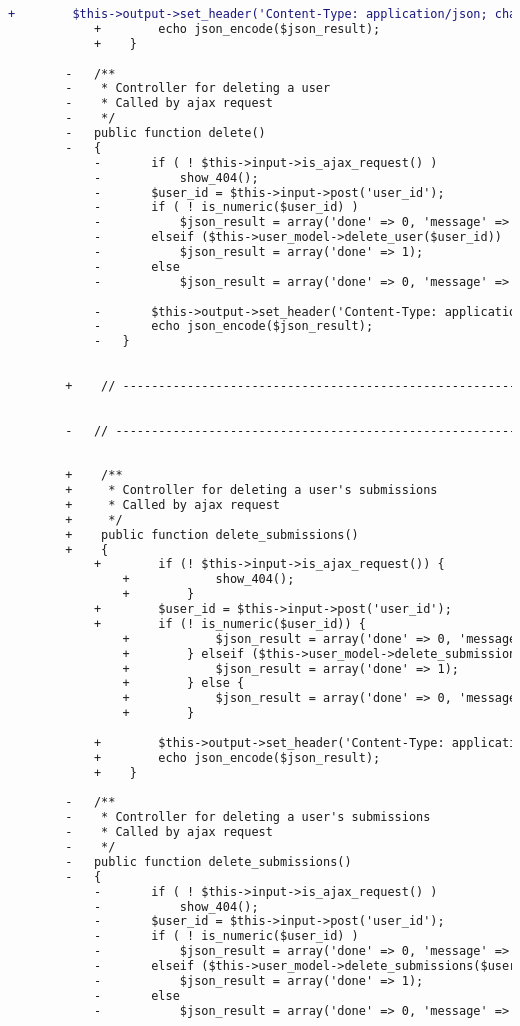 \begin{lstlisting}[language=diff, caption=Perubahan pada kode Users.php]
			+        $this->output->set_header('Content-Type: application/json; charset=utf-8');
			+        echo json_encode($json_result);
			+    }
		
		-	/**
		-	 * Controller for deleting a user
		-	 * Called by ajax request
		-	 */
		-	public function delete()
		-	{
			-		if ( ! $this->input->is_ajax_request() )
			-			show_404();
			-		$user_id = $this->input->post('user_id');
			-		if ( ! is_numeric($user_id) )
			-			$json_result = array('done' => 0, 'message' => 'Input Error');
			-		elseif ($this->user_model->delete_user($user_id))
			-			$json_result = array('done' => 1);
			-		else
			-			$json_result = array('done' => 0, 'message' => 'Deleting User Failed');
			
			-		$this->output->set_header('Content-Type: application/json; charset=utf-8');
			-		echo json_encode($json_result);
			-	}
		
		
		+    // ------------------------------------------------------------------------
		
		
		-	// ------------------------------------------------------------------------
		
		
		+    /**
		+     * Controller for deleting a user's submissions
		+     * Called by ajax request
		+     */
		+    public function delete_submissions()
		+    {
			+        if (! $this->input->is_ajax_request()) {
				+            show_404();
				+        }
			+        $user_id = $this->input->post('user_id');
			+        if (! is_numeric($user_id)) {
				+            $json_result = array('done' => 0, 'message' => 'Input Error');
				+        } elseif ($this->user_model->delete_submissions($user_id)) {
				+            $json_result = array('done' => 1);
				+        } else {
				+            $json_result = array('done' => 0, 'message' => 'Deleting Submissions Failed');
				+        }
			
			+        $this->output->set_header('Content-Type: application/json; charset=utf-8');
			+        echo json_encode($json_result);
			+    }
		
		-	/**
		-	 * Controller for deleting a user's submissions
		-	 * Called by ajax request
		-	 */
		-	public function delete_submissions()
		-	{
			-		if ( ! $this->input->is_ajax_request() )
			-			show_404();
			-		$user_id = $this->input->post('user_id');
			-		if ( ! is_numeric($user_id) )
			-			$json_result = array('done' => 0, 'message' => 'Input Error');
			-		elseif ($this->user_model->delete_submissions($user_id))
			-			$json_result = array('done' => 1);
			-		else
			-			$json_result = array('done' => 0, 'message' => 'Deleting Submissions Failed');
			

\end{lstlisting}
